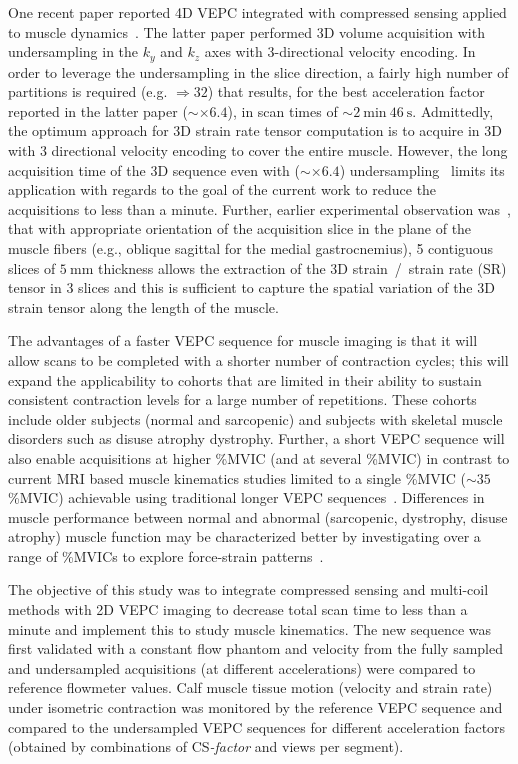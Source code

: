 One recent paper reported 4D VEPC integrated with compressed sensing applied to muscle dynamics~\cite{RNCS11}.
The latter paper performed 3D volume acquisition with undersampling in the $k_y$ and $k_z$ axes with 3-directional velocity encoding. 
In order to leverage the undersampling in the slice direction, a fairly high number of partitions is required (e.g. $\Rightarrow 32$) that results, for the best acceleration factor reported in the latter paper ($\sim \times 6.4$), in scan times of $\sim \SI{2}{\minute}~\SI{46}{\second}$. 
Admittedly, the optimum approach for 3D strain rate tensor computation is to acquire in 3D with 3 directional velocity encoding to cover the entire muscle. 
However, the long acquisition time of the 3D sequence even with ($\sim \times 6.4$) undersampling~\cite{RNCS11} limits its application with regards to the goal of the current work to reduce the acquisitions to less than a minute. 
Further, earlier experimental observation was~\cite{Malis:2018fr}, that with appropriate orientation of the acquisition slice in the plane of the muscle fibers (e.g., oblique sagittal for the medial gastrocnemius), 5 contiguous slices of $\SI{5}{\milli\meter}$ thickness allows the extraction of the 3D strain~/~strain rate (SR) tensor in 3 slices and this is sufficient to capture the spatial variation of the 3D strain tensor along the length of the muscle. 

The advantages of a faster VEPC sequence for muscle imaging is that it will allow scans to be completed with a shorter number of contraction cycles; this will expand the applicability to cohorts that are limited in their ability to sustain consistent contraction levels for a large number of repetitions. 
These cohorts include older subjects (normal and sarcopenic) and subjects with skeletal muscle disorders such as disuse atrophy dystrophy. 
Further, a short VEPC sequence will also enable acquisitions at higher \%MVIC (and at several \%MVIC) in contrast to current MRI based muscle kinematics studies limited to a single \%MVIC ($\sim 35$\%MVIC) achievable using traditional longer VEPC sequences~\cite{RNS16, Malis:2018fr}. 
Differences in muscle performance between normal and abnormal (sarcopenic, dystrophy, disuse atrophy) muscle function may be characterized better by investigating over a range of \%MVICs to explore force-strain patterns~\cite{RNCS12}. 

The objective of this study was to integrate compressed sensing and multi-coil methods with 2D VEPC imaging to decrease total scan time to less than a minute and implement this to study muscle kinematics. 
The new sequence was first validated with a constant flow phantom and velocity from the fully sampled and undersampled acquisitions (at different accelerations) were compared to reference flowmeter values. 
Calf muscle tissue motion (velocity and strain rate) under isometric contraction was monitored by the reference VEPC sequence and compared to the undersampled VEPC sequences for different acceleration factors (obtained by combinations of \mbox{CS\textit{-factor}} and views per segment).
